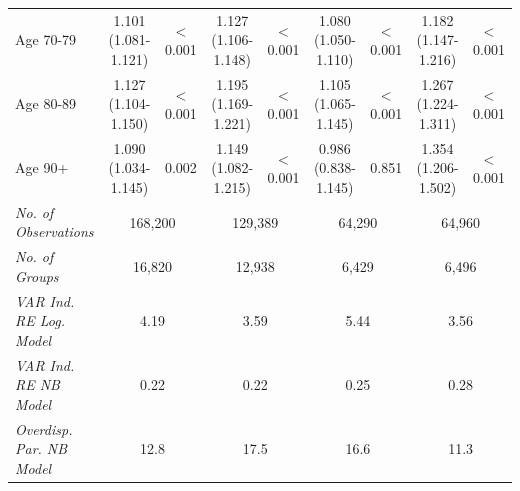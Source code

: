 \begin{landscape}
\begin{table}[htbp]
\begin{tabular}{lcccccccc}
    Age 70-79 & 1.101 (1.081-1.121) & $<$0.001 & 1.127 (1.106-1.148) & $<$0.001 & 1.080 (1.050-1.110) & $<$0.001 & 1.182 (1.147-1.216) & $<$0.001 \\
    Age 80-89 & 1.127 (1.104-1.150) & $<$0.001 & 1.195 (1.169-1.221) & $<$0.001 & 1.105 (1.065-1.145) & $<$0.001 & 1.267 (1.224-1.311) & $<$0.001 \\
    Age 90+ & 1.090 (1.034-1.145) & 0.002 & 1.149 (1.082-1.215) & $<$0.001 & 0.986 (0.838-1.145) & 0.851 & 1.354 (1.206-1.502) & $<$0.001 \\
    \midrule
    \textit{No. of Observations} & \multicolumn{2}{c}{168,200} & \multicolumn{2}{c}{129,389} & \multicolumn{2}{c}{64,290} & \multicolumn{2}{c}{64,960} \\
    \textit{No. of Groups} & \multicolumn{2}{c}{16,820} & \multicolumn{2}{c}{12,938} & \multicolumn{2}{c}{6,429} & \multicolumn{2}{c}{6,496} \\
    \textit{VAR Ind. RE Log. Model} & \multicolumn{2}{c}{4.19} & \multicolumn{2}{c}{3.59} & \multicolumn{2}{c}{5.44} & \multicolumn{2}{c}{3.56} \\
    \textit{VAR Ind. RE NB Model} & \multicolumn{2}{c}{0.22} & \multicolumn{2}{c}{0.22} & \multicolumn{2}{c}{0.25} & \multicolumn{2}{c}{0.28} \\
    \textit{Overdisp. Par. NB Model} & \multicolumn{2}{c}{12.8} & \multicolumn{2}{c}{17.5} & \multicolumn{2}{c}{16.6} & \multicolumn{2}{c}{11.3} \\
    \bottomrule
    \end{tabular}%
\label{ch3:tabS3}
\end{table}%


\end{landscape}


